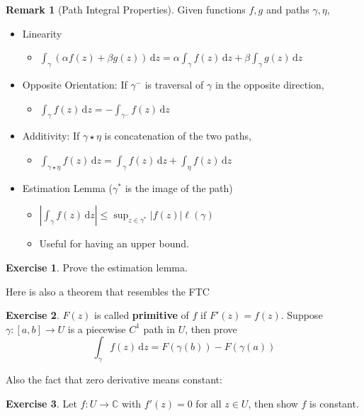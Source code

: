 \documentclass[a4paper, 12pt]{article}
\theoremstyle{definition}
\newtheorem{exercise}{Exercise}
\newtheorem{remark}{Remark}
\numberwithin{theorem}{section}
\numberwithin{definition}{section}
\numberwithin{exercise}{section}
\numberwithin{remark}{section}
\numberwithin{figure}{section}
\numberwithin{example}{section}
\newcommand{\C}{\mathbb{C}}
\newcommand{\intd}{\,\text{d}}
\begin{document}
\begin{remark}[Path Integral Properties]
    Given functions $f,g$ and paths $\gamma, \eta$,
    \begin{itemize}
        \item Linearity
            \begin{itemize}
                \item $\int_{\gamma} \left( \alpha f(z) + \beta g(z) \right) \intd z = \alpha \int_\gamma f(z) \intd z + \beta \int_\gamma g(z) \intd z$
            \end{itemize}
        \item Opposite Orientation: If $\gamma^{-}$ is traversal of $\gamma$ in the opposite direction,
            \begin{itemize}
                \item $\int_{\gamma} f(z) \intd z = -\int_{\gamma^{-}} f(z) \intd z$
            \end{itemize}
        \item Additivity: If $\gamma \star \eta$ is concatenation of the two paths,
            \begin{itemize}
                \item $\int_{\gamma \star \eta} f(z) \intd z = \int_{\gamma} f(z) \intd z + \int_{\eta} f(z) \intd z$
            \end{itemize}
        \item Estimation Lemma ($\gamma^*$ is the image of the path)
            \begin{itemize}
                \item $\left| \int_{\gamma} f(z) \intd z\right| \leq \sup_{z\in\gamma^*} |f(z)| \ell \left( \gamma \right)$
                \item Useful for having an upper bound.
            \end{itemize}
    \end{itemize}
\end{remark}
\begin{exercise}
    Prove the estimation lemma.
\end{exercise}
Here is also a theorem that resembles the FTC
\begin{exercise}
    $F(z)$ is called \textbf{primitive} of $f$ if $F'(z) = f(z)$.
    Suppose $\gamma:[a,b] \rightarrow U$ is a piecewise $C^1$ path in $U$, then prove
    \begin{equation*}
        \int_{\gamma} f(z) \intd z = F\left( \gamma(b) \right) - F \left( \gamma(a) \right)
    \end{equation*}
\end{exercise}
Also the fact that zero derivative means constant:
\begin{exercise}
    Let $f:U \rightarrow \C$ with $f'(z) = 0$ for all $z \in U$, then show $f$ is constant.
\end{exercise}
\end{document}
